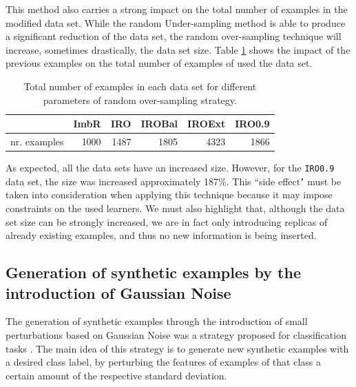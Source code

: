\documentclass[10pt,a4paper]{article}\usepackage[]{graphicx}\usepackage[]{color}
\begin{document}
This method also carries a strong impact on the total number of examples in the modified data set. While the random Under-sampling method is able to produce a significant reduction of the data set, the random over-sampling technique will increase, sometimes drastically, the data set size. Table \ref{tab:ROReg_table} shows the impact of the previous examples on the total number of examples of used the data set.

\begin{table}[ht]
\centering
\begin{tabular}{rrrrrr}
  \hline
 & ImbR & IRO & IROBal & IROExt & IRO0.9 \\ 
  \hline
nr. examples & 1000 & 1487 & 1805 & 4323 & 1866 \\ 
   \hline
\end{tabular}
\caption{Total number of examples in each data set for different parameters of random over-sampling strategy.} 
\label{tab:ROReg_table}
\end{table}


As expected, all the data sets have an increased size. However, for the \texttt{IRO0.9} data set, the size was increased approximately 187\%. This ``side effect" must be taken into consideration when applying this technique because it may impose constraints on the used learners. We must also highlight that, although the data set size can be strongly increased, we are in fact only introducing replicas of already existing examples, and thus no new information is being inserted.



\subsection{Generation of synthetic examples by the introduction of Gaussian Noise}\label{sec:gnRegress}

The generation of synthetic examples through the introduction of small perturbations based on Gaussian Noise was a strategy proposed for classification tasks \cite{lee1999regularization, lee2000noisy}. The main idea of this strategy is to generate new synthetic examples with a desired class label, by perturbing the features of examples of that class a certain amount of the respective standard deviation. 
\end{document}

